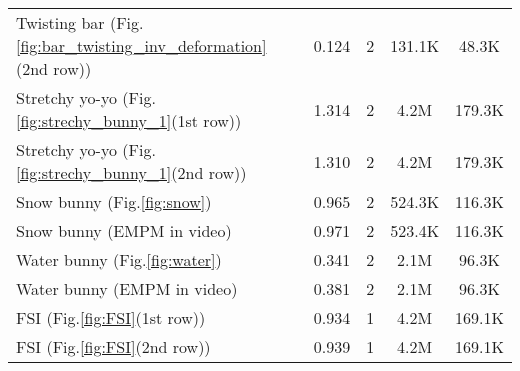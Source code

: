 \begin{table}[h!]
\begin{center}
{\begin{tabular}{lcccc}
Twisting bar (Fig.\ref{fig:bar_twisting_inv_deformation}(2nd row))   & 0.124     & 2  & 131.1K   & 48.3K \\
Stretchy yo-yo (Fig.\ref{fig:strechy_bunny_1}(1st row))  & 1.314 &  2    &  4.2M     &  179.3K \\
Stretchy yo-yo (Fig.\ref{fig:strechy_bunny_1}(2nd row))     & 1.310 &  2    &  4.2M     &  179.3K \\
Snow bunny (Fig.\ref{fig:snow}) & 0.965     &  2    &  524.3K   &  116.3K \\
Snow bunny (EMPM in video)                 & 0.971     &  2    &  523.4K   &  116.3K \\
Water bunny (Fig.\ref{fig:water})       & 0.341     &  2    &  2.1M     &  96.3K \\
Water bunny (EMPM in video)                        & 0.381     &  2    &  2.1M     &  96.3K \\
FSI (Fig.\ref{fig:FSI}(1st row)) & 0.934         & 1 & 4.2M &  169.1K\\
FSI (Fig.\ref{fig:FSI}(2nd row))      & 0.939  & 1 & 4.2M & 169.1K\\
\hline
\end{tabular}
}
\end{center}
\label{tab:timings}
\vspace{-5mm}
\end{table}

\begin{table}[h!]
\caption{Configuration update cost in fluid-like simulations. \textbf{$\epsilon$} and  \textbf{$\eta$}: user-defined parameters to adjust the update frequency.  \textbf{$\tau$}: average update times per 104 time steps. \textbf{Cost}: average run-time.}
\vspace{-4mm}
\begin{center}
\end{center}
\label{tab:timings2}
\vspace{-5.5mm}
\end{table}


